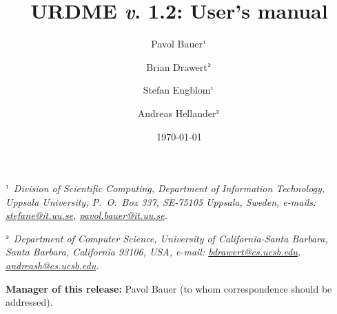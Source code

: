 \documentclass[a4paper,10pt]{article}
\title{URDME \textit{v}. 1.2: User's manual \\}
\author{Pavol Bauer$^{\mbox{{\tiny 1}}}$ \and Brian
  Drawert$^{\mbox{{\tiny 2}}}$ \and Stefan Engblom$^{\mbox{{\tiny
        1}}}$ \and Andreas Hellander$^{\mbox{{\tiny 2}}}$}
\date{\today}
\numberwithin{equation}{section}
\numberwithin{table}{section}
\numberwithin{figure}{section}
\begin{document}

\maketitle

{\footnotesize \em $^{\mbox{\tiny\rm 1}}$ Division of Scientific
  Computing, Department of Information Technology, Uppsala University,
  P.~O.~Box 337, SE-75105 Uppsala, Sweden, e-mails:
  \href{mailto:stefane@it.uu.se}{stefane@it.uu.se},
  \href{mailto:pavol.bauer@it.uu.se}{pavol.bauer@it.uu.se}.}

{\footnotesize \em $^{\mbox{\tiny\rm 2}}$ Department of Computer
  Science, University of California-Santa Barbara, Santa Barbara,
  California 93106, USA, e-mail:
  \href{mailto:bdrawert@cs.ucsb.edu}{bdrawert@cs.ucsb.edu},
  \href{mailto:andreash@cs.ucsb.edu}{andreash@cs.ucsb.edu}.}


\medskip

{\footnotesize \textbf{Manager of this release:} Pavol Bauer (to
  whom correspondence should be addressed).}


 


\newpage

\clearpage

\appendix


\end{document}
